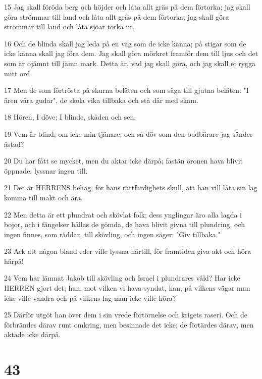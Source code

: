 \par 15 Jag skall föröda berg och höjder och låta allt gräs på dem förtorka; jag skall göra strömmar till land och låta allt gräs på dem förtorka; jag skall göra strömmar till land och låta sjöar torka ut.
\par 16 Och de blinda skall jag leda på en väg som de icke känna; på stigar som de icke känna skall jag föra dem. Jag skall göra mörkret framför dem till ljus och det som är ojämnt till jämn mark. Detta är, vad jag skall göra, och jag skall ej rygga mitt ord.
\par 17 Men de som förtrösta på skurna beläten och som säga till gjutna beläten: "I ären våra gudar", de skola vika tillbaka och stå där med skam.
\par 18 Hören, I döve; I blinde, skåden och sen.
\par 19 Vem är blind, om icke min tjänare, och så döv som den budbärare jag sänder åstad?
\par 20 Du har fått se mycket, men du aktar icke därpå; fastän öronen hava blivit öppnade, lyssnar ingen till.
\par 21 Det är HERRENS behag, för hans rättfärdighets skull, att han vill låta sin lag komma till makt och ära.
\par 22 Men detta är ett plundrat och skövlat folk; dess ynglingar äro alla lagda i bojor, och i fängelser hållas de gömda, de hava blivit givna till plundring, och ingen finnes, som räddar, till skövling, och ingen säger: "Giv tillbaka."
\par 23 Ack att någon bland eder ville lyssna härtill, för framtiden giva akt och höra härpå!
\par 24 Vem har lämnat Jakob till skövling och Israel i plundrares våld? Har icke HERREN gjort det; han, mot vilken vi hava syndat, han, på vilkens vägar man icke ville vandra och på vilkens lag man icke ville höra?
\par 25 Därför utgöt han över dem i sin vrede förtörnelse och krigets raseri. Och de förbrändes därav runt omkring, men besinnade det icke; de förtärdes därav, men aktade icke därpå.

\chapter{43}

